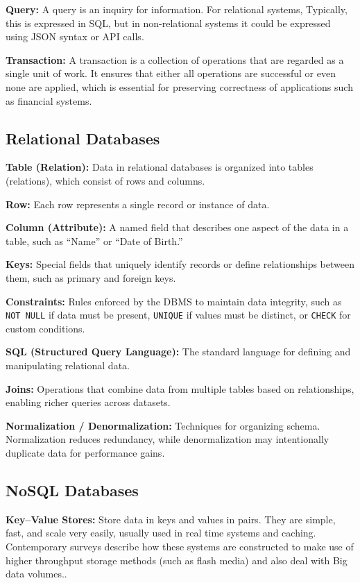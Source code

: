 \textbf{Query:} A query is an inquiry for information. For relational systems,
Typically, this is expressed in SQL, but in non-relational systems it could be
expressed using JSON syntax or API calls.

\textbf{Transaction:} A transaction is a collection of operations that are
regarded as a single unit of work. It ensures that either all operations are
successful or even none
are applied, which is essential for preserving correctness of applications such
as financial systems\cite{Haerder1983}.

\subsection{Relational Databases} \textbf{Table (Relation):} Data in relational
databases is organized into tables (relations), which consist of rows and
columns\cite{Codd1970}.

\textbf{Row:} Each row represents a single record or instance of data.

\textbf{Column (Attribute):} A named field that describes one aspect of the
data in a table, such as “Name” or “Date of Birth.”

\textbf{Keys:} Special fields that uniquely identify records or define
relationships between them, such as primary and foreign keys.

\textbf{Constraints:} Rules enforced by the DBMS to maintain data integrity,
such as \texttt{NOT NULL} if data must be present, \texttt{UNIQUE} if values
must be distinct, or \texttt{CHECK} for custom conditions.

\textbf{SQL (Structured Query Language):} The standard language for defining
and manipulating relational data.

\textbf{Joins:} Operations that combine data from multiple tables based on
relationships, enabling richer queries across datasets.

\textbf{Normalization / Denormalization:} Techniques for organizing schema.
Normalization reduces redundancy, while denormalization may intentionally
duplicate data for performance gains.

\subsection{NoSQL Databases}
\textbf{Key–Value Stores:} Store data in keys and values in pairs. They are
simple, fast, and scale very easily, usually used in real time systems and
caching. Contemporary surveys describe how these systems are constructed to
make use of higher throughput storage methods (such as flash media) and also
deal with Big data volumes.\cite{Doekemeijer2022}.

